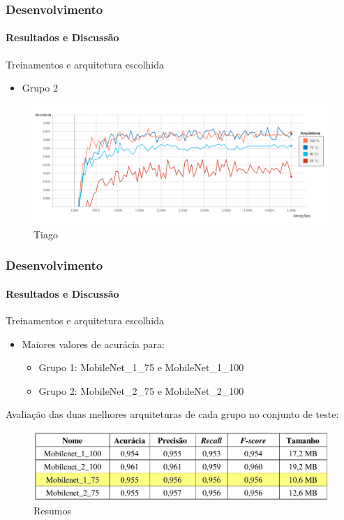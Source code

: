 \documentclass{beamer}
\begin{document}
    \begin{frame}
      \frametitle{Desenvolvimento}
      \framesubtitle{Resultados e Discussão} \medskip       
      	Treinamentos e arquitetura escolhida \medskip    
      	\begin{itemize}
      		\item Grupo 2
		\end{itemize}      	  	
		\begin{figure}[t]
      		 \begin{minipage}[h]{1.0\linewidth}
         		\centering
      			\includegraphics[height=0.42\linewidth]{img/acc_2_5000.png}
      			\caption{Tiago}
      		\end{minipage}
      		\vspace{0.00mm}
      	\end{figure}	      	       
    \end{frame}
    
    \begin{frame}[t]
    		\frametitle{Desenvolvimento}
    		\framesubtitle{Resultados e Discussão}
       	Treinamentos e arquitetura escolhida \medskip    
    		\begin{itemize}
      		\item Maiores valores de acurácia para:
			\begin{itemize}
				\item Grupo 1: MobileNet\_1\_75 e MobileNet\_1\_100
				\item Grupo 2: MobileNet\_2\_75 e MobileNet\_2\_100 \medskip
			\end{itemize}	      		
		\end{itemize}		
		{
			Avaliação das duas melhores arquiteturas de cada grupo no conjunto de teste:
			\visible<3->
			{
				\begin{figure}[hbt]
      	 		\begin{center}
      			\includegraphics[height=.2 \textwidth]{img/all_metrics_2.png}
      			\end{center}
      			\caption{Resumos~\cite{computer-1209641}}
      			\end{figure}	
			}
		}       	      	
    \end{frame}
	
\end{document}

